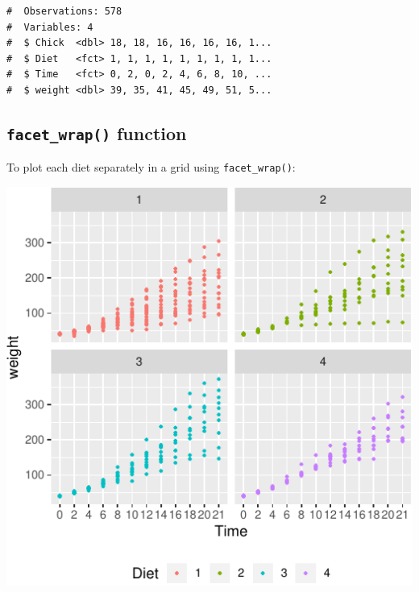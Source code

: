 \documentclass[a4paper,9pt,twocolumn,twoside,printwatermark=false]{pinp}
\begin{document}
\begin{ShadedResult}
\begin{verbatim}
#  Observations: 578
#  Variables: 4
#  $ Chick  <dbl> 18, 18, 16, 16, 16, 16, 1...
#  $ Diet   <fct> 1, 1, 1, 1, 1, 1, 1, 1, 1...
#  $ Time   <fct> 0, 2, 0, 2, 4, 6, 8, 10, ...
#  $ weight <dbl> 39, 35, 41, 45, 49, 51, 5...
\end{verbatim}
\end{ShadedResult}

\subsection{\texorpdfstring{\texttt{facet\_wrap()}
function}{facet\_wrap() function}}\label{facet_wrap-function}

To plot each diet separately in a grid using \texttt{facet\_wrap()}:

\begin{Shaded}
\begin{Highlighting}[]
\OperatorTok{+}
\StringTok{  }\NormalTok{() }\OperatorTok{+}
\StringTok{  }\NormalTok{(}\OperatorTok{~}\OperatorTok{+}
\StringTok{  }\NormalTok{(} \NormalTok{)}
\end{Highlighting}
\end{Shaded}

\begin{center}\includegraphics{Getting-Started-in-R_files/figure-latex/jitterPlot-1} \end{center}
\end{document}
